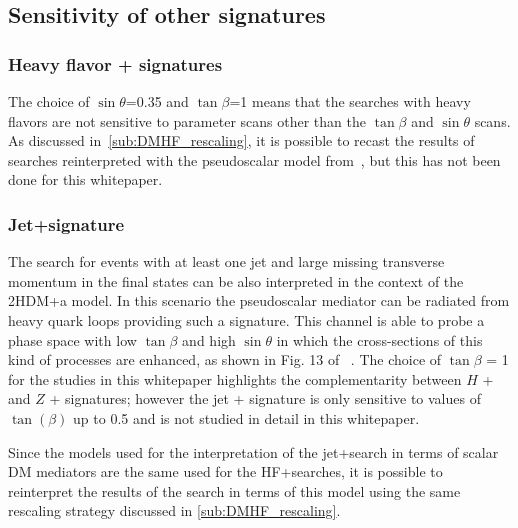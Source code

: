 \subsection{Sensitivity of other signatures}

\subsubsection{Heavy flavor + \MET signatures}

The choice of $\sin\theta$=0.35 and $\tan\beta$=1 means that the searches with heavy flavors are not sensitive to parameter scans other than the $\tan\beta$ and $\sin\theta$ scans. As discussed in~\autoref{sub:DMHF_rescaling}, it is possible to recast the results of searches reinterpreted with the pseudoscalar model from~\cite{Abercrombie:2015wmb}, but this has not been done for this whitepaper. 

\subsubsection{Jet+\MET signature}

The search for events with at least one jet and large missing transverse momentum in the final states can be also interpreted in the context of the 2HDM+a model. In this scenario the pseudoscalar mediator can be radiated from heavy quark loops providing such a signature. This channel is able to probe a phase space with low $\tan\beta$ and high $\sin\theta$ in which the cross-sections of this kind of processes are enhanced, as shown in Fig. 13 of ~\cite{Bauer:2017ota}. The choice of $\tan\beta$ = 1 for the studies in this whitepaper highlights the complementarity between $H$ + \MET and $Z$ + \MET signatures; however the jet + \MET signature is only sensitive to values of $\tan(\beta)$ up to 0.5 and is not studied in detail in this whitepaper. 

Since the models used for the interpretation of the jet+\MET search in terms of scalar DM mediators are the same used for the HF+\MET searches, it is possible to reinterpret the results of the search in terms of this model using the same rescaling strategy discussed in \autoref{sub:DMHF_rescaling}. 

%

\FloatBarrier